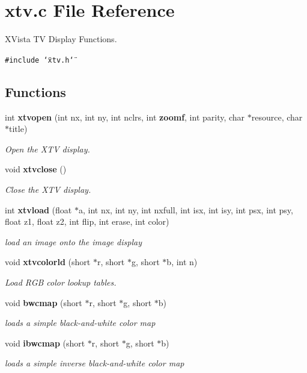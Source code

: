 \section{xtv.c File Reference}
\label{xtv_8c}
XVista TV Display Functions. 

{\tt \#include \char`\"{}xtv.h\char`\"{}}\par
\subsection*{Functions}
\begin{CompactItemize}
\item 
int {\bf xtvopen} (int nx, int ny, int nclrs, int {\bf zoomf}, int parity, char $\ast$resource, char $\ast$title)
\begin{CompactList}\small\item\em Open the XTV display. \item\end{CompactList}\item 
void {\bf xtvclose} ()
\begin{CompactList}\small\item\em Close the XTV display. \item\end{CompactList}\item 
int {\bf xtvload} (float $\ast$a, int nx, int ny, int nxfull, int isx, int isy, int psx, int psy, float z1, float z2, int flip, int erase, int color)
\begin{CompactList}\small\item\em load an image onto the image display \item\end{CompactList}\item 
void {\bf xtvcolorld} (short $\ast$r, short $\ast$g, short $\ast$b, int n)
\begin{CompactList}\small\item\em Load RGB color lookup tables. \item\end{CompactList}\item 
void {\bf bwcmap} (short $\ast$r, short $\ast$g, short $\ast$b)
\begin{CompactList}\small\item\em loads a simple black-and-white color map \item\end{CompactList}\item 
void {\bf ibwcmap} (short $\ast$r, short $\ast$g, short $\ast$b)
\begin{CompactList}\small\item\em loads a simple inverse black-and-white color map \item\end{CompactList}\end{CompactItemize}
